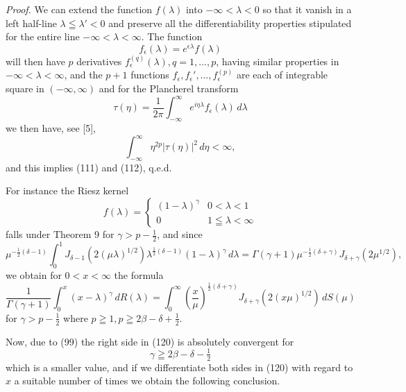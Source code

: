 \documentclass[12pt]{article}
\begin{document}
\emph{Proof.} We can extend the function \(f(\lambda)\) into \(-\infty < \lambda < 0\) so that it vanish in a left half-line \(\lambda \leqq \lambda' < 0\) and preserve all the differentiability properties stipulated for the entire line \(-\infty < \lambda < \infty\). The function
\begin{equation}
f_\epsilon(\lambda) = e^{\epsilon\lambda} f(\lambda)
\tag{115}
\end{equation}
will then have \(p\) derivatives \(f_\epsilon^{(q)}(\lambda), q = 1, \dots, p\), having similar properties in \(-\infty < \lambda < \infty\), and the \(p+1\) functions \(f_\epsilon, f_\epsilon', \dots, f_\epsilon^{(p)}\) are each of integrable square in \((-\infty, \infty)\) and for the Plancherel transform
\begin{equation}
\tau(\eta) = \frac{1}{2\pi} \int_{-\infty}^{\infty} e^{i\eta\lambda} f_\epsilon(\lambda) \, d\lambda
\tag{116}
\end{equation}
we then have, see [5],
\begin{equation}
\int_{-\infty}^{\infty} \eta^{2p} | \tau(\eta) |^2 \, d\eta < \infty,
\tag{117}
\end{equation}
and this implies (111) and (112), q.e.d.

For instance the Riesz kernel
\begin{equation}
f(\lambda) =
\begin{cases}
(1 - \lambda)^\gamma & 0 < \lambda < 1 \\
0 & 1 \leqq \lambda < \infty
\end{cases}
\tag{118}
\end{equation}
falls under Theorem 9 for \(\gamma > p - \tfrac{1}{2}\), and since
\begin{equation}
\mu^{-\frac{1}{2}(\delta-1)} \int_0^1 J_{\delta-1}(2(\mu\lambda)^{1/2}) \lambda^{\frac{1}{2}(\delta-1)} (1 - \lambda)^\gamma \, d\lambda = \Gamma(\gamma + 1) \mu^{-\frac{1}{2}(\delta+\gamma)} J_{\delta+\gamma}(2\mu^{1/2}),
\tag{119}
\end{equation}
we obtain for \(0 < x < \infty\) the formula
\begin{equation}
\frac{1}{\Gamma(\gamma + 1)} \int_0^x (x - \lambda)^\gamma \, dR(\lambda) = \int_0^{\infty} \left( \frac{x}{\mu} \right)^{\frac{1}{2}(\delta+\gamma)} J_{\delta+\gamma}(2(x\mu)^{1/2}) \, dS(\mu)
\tag{120}
\end{equation}
for \(\gamma > p - \tfrac{1}{2}\) where \(p \geqq 1, p \geqq 2\beta - \delta + \tfrac{1}{2}\).

Now, due to (99) the right side in (120) is absolutely convergent for
\begin{equation}
\gamma \geqq 2\beta - \delta - \tfrac{1}{2}
\tag{121}
\end{equation}
which is a smaller value, and if we differentiate both sides in (120) with regard to \(x\) a suitable number of times we obtain the following conclusion.
\end{document}

